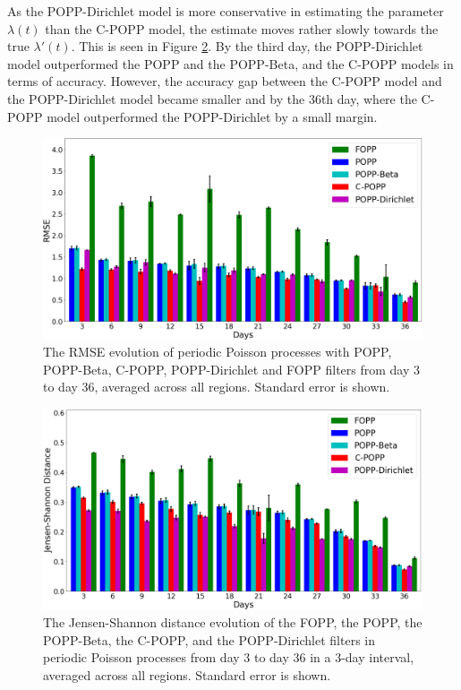 As the POPP-Dirichlet model is more conservative in estimating the parameter $\lambda(t)$ than the C-POPP model, the estimate moves rather slowly towards the true $\lambda'(t)$. This is seen in Figure \ref{fig:fopp_popp_popb_npop_popd_kl_evo}.
By the third day, the POPP-Dirichlet model outperformed the POPP and the POPP-Beta, and the C-POPP models in terms of accuracy. However, the accuracy gap between the C-POPP model and the POPP-Dirichlet model became smaller and by the 36th day, where the C-POPP model outperformed the POPP-Dirichlet by a small margin.

\begin{figure}[t!]
	\centering
	\includegraphics[width=0.95\columnwidth]{./figures/fopp_popp_popb_npop_popd_rmse_evo.png}
	\caption{The RMSE evolution of periodic Poisson processes with POPP, POPP-Beta, C-POPP, POPP-Dirichlet and FOPP filters from day 3 to day 36, averaged across all regions. Standard error is shown.}
	\label{fig:fopp_popp_popb_npop_popd_rmse_evo}
\end{figure}

\begin{figure}[t!]
	\centering
	\includegraphics[width=0.95\columnwidth]{./figures/fopp_popp_popb_npop_popd_kl_evo.png}
	\caption{The Jensen-Shannon distance evolution of the FOPP, the POPP, the POPP-Beta, the C-POPP, and the POPP-Dirichlet filters in periodic Poisson processes from day 3 to day 36 in a 3-day interval, averaged across all regions. Standard error is shown.}
	\label{fig:fopp_popp_popb_npop_popd_kl_evo}
\end{figure}

